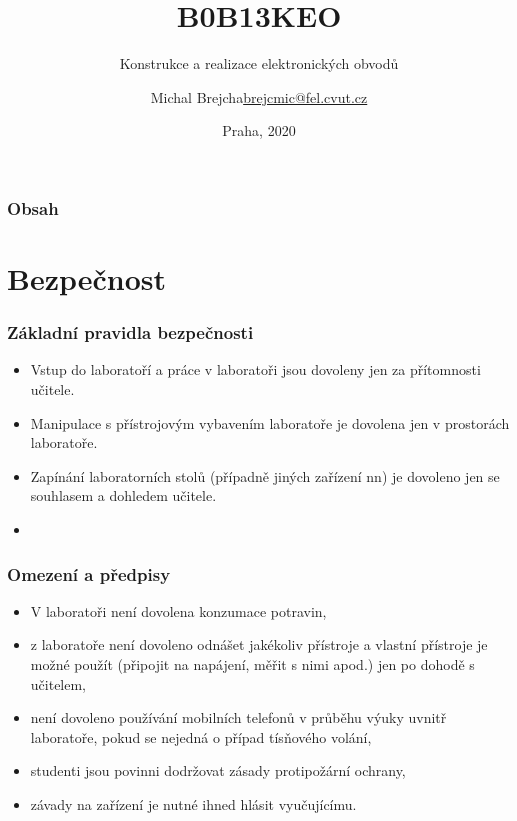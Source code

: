 \documentclass{beamer}
\title[B0B13KEO]{B0B13KEO}
\subtitle[KEO] {Konstrukce a realizace elektronických obvodů}
\author[Brejcha]{\texorpdfstring{Michal Brejcha\newline\url{brejcmic@fel.cvut.cz}}{Michal Brejcha}}
\institute[CVUT]{ČVUT v Praze, FEL}
\date[Praha, 2020]{Praha, 2020}
\begin{document}
\frame{\titlepage}

\begin{frame}
\frametitle{Obsah} 
\tableofcontents
\end{frame}


\section{\texorpdfstring{Bezpečnost}{Bezpecnost}}
	\begin{frame}
    \frametitle{Základní pravidla bezpečnosti}
		\begin{itemize}
		\item Vstup do laboratoří a práce v laboratoři jsou dovoleny jen za přítomnosti učitele.
		\item Manipulace s přístrojovým vybavením laboratoře je dovolena jen v prostorách laboratoře.
		\item Zapínání laboratorních stolů (případně jiných zařízení nn) je dovoleno jen se souhlasem a dohledem učitele.
		\item \textbf{}
		\end{itemize}
	\end{frame}
	\begin{frame}
    \frametitle{Omezení a předpisy}
		\begin{itemize}
		\item V laboratoři není dovolena konzumace potravin,
    \item z laboratoře není dovoleno odnášet jakékoliv přístroje a vlastní přístroje je možné použít (připojit na napájení, měřit s nimi apod.) jen po dohodě s učitelem,
		\item není dovoleno používání mobilních telefonů v průběhu výuky uvnitř laboratoře, pokud se nejedná o případ tísňového volání,
		\item studenti jsou povinni dodržovat zásady protipožární ochrany,
		\item závady na zařízení je nutné ihned hlásit vyučujícímu.
		\end{itemize}
	\end{frame}
\end{document}
